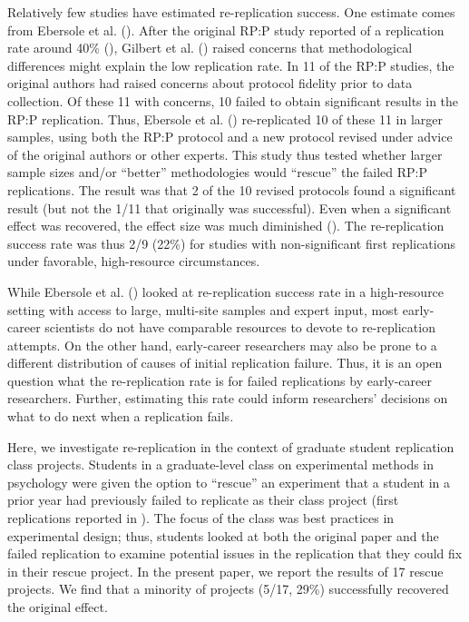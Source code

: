 \documentclass[
  english,
  a4paper,
]{article}
\begin{document}
Relatively few studies have estimated re-replication success.
One estimate comes from Ebersole et al. ().
After the original RP:P study reported of a replication rate around 40\% (), Gilbert et al. () raised concerns that methodological differences might explain the low replication rate.
In 11 of the RP:P studies, the original authors had raised concerns about protocol fidelity prior to data collection.
Of these 11 with concerns, 10 failed to obtain significant results in the RP:P replication.
Thus, Ebersole et al. () re-replicated 10 of these 11 in larger samples, using both the RP:P protocol and a new protocol revised under advice of the original authors or other experts.
This study thus tested whether larger sample sizes and/or ``better'' methodologies would ``rescue'' the failed RP:P replications.
The result was that 2 of the 10 revised protocols found a significant result (but not the 1/11 that originally was successful).
Even when a significant effect was recovered, the effect size was much diminished ().
The re-replication success rate was thus 2/9 (22\%) for studies with non-significant first replications under favorable, high-resource circumstances.

While Ebersole et al. () looked at re-replication success rate in a high-resource setting with access to large, multi-site samples and expert input, most early-career scientists do not have comparable resources to devote to re-replication attempts.
On the other hand, early-career researchers may also be prone to a different distribution of causes of initial replication failure.
Thus, it is an open question what the re-replication rate is for failed replications by early-career researchers.
Further, estimating this rate could inform researchers' decisions on what to do next when a replication fails.

Here, we investigate re-replication in the context of graduate student replication class projects.
Students in a graduate-level class on experimental methods in psychology were given the option to ``rescue'' an experiment that a student in a prior year had previously failed to replicate as their class project (first replications reported in ).
The focus of the class was best practices in experimental design; thus, students looked at both the original paper and the failed replication to examine potential issues in the replication that they could fix in their rescue project.
In the present paper, we report the results of 17 rescue projects.
We find that a minority of projects (5/17, 29\%) successfully recovered the original effect.
\end{document}
